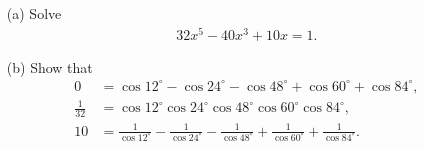 \documentclass[12pt,a4paper]{memoir}
\theoremstyle{definition}
\begin{document}
\begin{tcolorbox}
	\begin{question}
		\begin{itemize}
			\item[(a)] Solve
			\begin{align*}
				32x^5 - 40x^3 + 10x = 1.
			\end{align*}
			\item[(b)] Show that
			\begin{align*}
				0 &= \cos 12^\circ - \cos 24^\circ - \cos 48^\circ + \cos 60^\circ + \cos 84^\circ,\\
				\frac{1}{32} &= \cos 12^\circ \cos 24^\circ \cos 48^\circ \cos 60^\circ \cos 84^\circ,\\
				10 &= \frac{1}{\cos 12^\circ} -\frac{1}{\cos 24^\circ}-\frac{1}{\cos 48^\circ} + \frac{1}{\cos 60^\circ} +\frac{1}{\cos 84^\circ}.
			\end{align*}
		\end{itemize}
	\end{question}
\end{tcolorbox}
\end{document}
